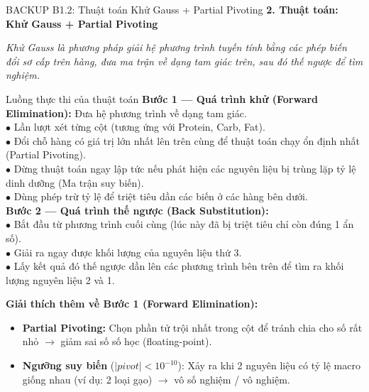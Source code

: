 \documentclass[10pt, aspectratio=169]{beamer}
\begin{document}
\begin{frame}[fragile, label=b1_2]{BACKUP B1.2: Thuật toán Khử Gauss + Partial Pivoting}
\hypertarget{b1_2_target}{}
    \textbf{2. Thuật toán: Khử Gauss + Partial Pivoting}
    
    \footnotesize \textit{Khử Gauss là phương pháp giải hệ phương trình tuyến tính bằng các phép biến đổi sơ cấp trên hàng, đưa ma trận về dạng tam giác trên, sau đó thế ngược để tìm nghiệm.}
    \vspace{0.1cm}
    
    \begin{block}{Luồng thực thi của thuật toán}
        \footnotesize
        \textbf{Bước 1 — Quá trình khử (Forward Elimination):} Đưa hệ phương trình về dạng tam giác.\\
        $\bullet$ Lần lượt xét từng cột (tương ứng với Protein, Carb, Fat).\\
        $\bullet$ Đổi chỗ hàng có giá trị lớn nhất lên trên cùng để thuật toán chạy ổn định nhất (Partial Pivoting).\\
        $\bullet$ Dừng thuật toán ngay lập tức nếu phát hiện các nguyên liệu bị trùng lặp tỷ lệ dinh dưỡng (Ma trận suy biến).\\
        $\bullet$ Dùng phép trừ tỷ lệ để triệt tiêu dần các biến ở các hàng bên dưới.\\
        
        \vspace{0.1cm}
        \textbf{Bước 2 — Quá trình thế ngược (Back Substitution):}\\
        $\bullet$ Bắt đầu từ phương trình cuối cùng (lúc này đã bị triệt tiêu chỉ còn đúng 1 ẩn số).\\
        $\bullet$ Giải ra ngay được khối lượng của nguyên liệu thứ 3.\\
        $\bullet$ Lấy kết quả đó thế ngược dần lên các phương trình bên trên để tìm ra khối lượng nguyên liệu 2 và 1.
    \end{block}
    
    \vspace{0.1cm}
    \textbf{Giải thích thêm về Bước 1 (Forward Elimination):}
    \begin{itemize}
        \small
        \item \textbf{Partial Pivoting:} Chọn phần tử trội nhất trong cột để tránh chia cho số rất nhỏ $\rightarrow$ giảm sai số số học (floating-point).
        \item \textbf{Ngưỡng suy biến} ($|pivot| < 10^{-10}$): Xảy ra khi 2 nguyên liệu có tỷ lệ macro giống nhau (ví dụ: 2 loại gạo) $\rightarrow$ vô số nghiệm / vô nghiệm.
    \end{itemize}
\end{frame}
\end{document}
